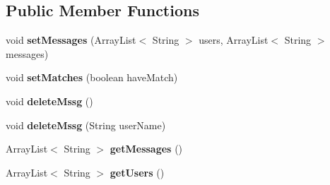 \subsection*{Public Member Functions}
\begin{DoxyCompactItemize}
\item 
void {\bfseries set\+Messages} (Array\+List$<$ String $>$ users, Array\+List$<$ String $>$ messages)\hypertarget{classcom_1_1example_1_1sebastian_1_1tindertp_1_1commonTools_1_1DataThroughActivities_a1aafa7439bada6ac8f188db070a46f33}{}\label{classcom_1_1example_1_1sebastian_1_1tindertp_1_1commonTools_1_1DataThroughActivities_a1aafa7439bada6ac8f188db070a46f33}

\item 
void {\bfseries set\+Matches} (boolean have\+Match)\hypertarget{classcom_1_1example_1_1sebastian_1_1tindertp_1_1commonTools_1_1DataThroughActivities_a029ef54dd516e8f933a2c91b0f13827a}{}\label{classcom_1_1example_1_1sebastian_1_1tindertp_1_1commonTools_1_1DataThroughActivities_a029ef54dd516e8f933a2c91b0f13827a}

\item 
void {\bfseries delete\+Mssg} ()\hypertarget{classcom_1_1example_1_1sebastian_1_1tindertp_1_1commonTools_1_1DataThroughActivities_ab0746d6008ca77bf6a2615263a39bcfe}{}\label{classcom_1_1example_1_1sebastian_1_1tindertp_1_1commonTools_1_1DataThroughActivities_ab0746d6008ca77bf6a2615263a39bcfe}

\item 
void {\bfseries delete\+Mssg} (String user\+Name)\hypertarget{classcom_1_1example_1_1sebastian_1_1tindertp_1_1commonTools_1_1DataThroughActivities_a87abc28d0d05f4ec5c20861dd1bcd900}{}\label{classcom_1_1example_1_1sebastian_1_1tindertp_1_1commonTools_1_1DataThroughActivities_a87abc28d0d05f4ec5c20861dd1bcd900}

\item 
Array\+List$<$ String $>$ {\bfseries get\+Messages} ()\hypertarget{classcom_1_1example_1_1sebastian_1_1tindertp_1_1commonTools_1_1DataThroughActivities_a65f039291214ccbc8bd00f25e99ee055}{}\label{classcom_1_1example_1_1sebastian_1_1tindertp_1_1commonTools_1_1DataThroughActivities_a65f039291214ccbc8bd00f25e99ee055}

\item 
Array\+List$<$ String $>$ {\bfseries get\+Users} ()\hypertarget{classcom_1_1example_1_1sebastian_1_1tindertp_1_1commonTools_1_1DataThroughActivities_a788fb5e5f439ec4e55c591a2dac0f7e4}{}\label{classcom_1_1example_1_1sebastian_1_1tindertp_1_1commonTools_1_1DataThroughActivities_a788fb5e5f439ec4e55c591a2dac0f7e4}


\end{DoxyCompactItemize}
